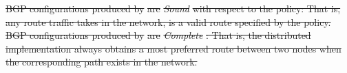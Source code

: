 \documentclass{sig-alternate-10pt}
\newcommand{\sysname}{{\small \sf Propane}\xspace}
\providecommand{\DIFdel}[1]{{\protect\color{red}\sout{#1}}}                      %
\providecommand{\DIFdelbegin}{} %
\providecommand{\DIFdelend}{} %
\begin{document}
\DIFdel{BGP configurations produced by }%
\DIFdel{are }\textit{\DIFdel{Sound}} %
\DIFdel{with respect to the policy: That is, any route traffic takes in the network, is a valid route specified by the policy.
}%
\DIFdelend %
%
\DIFdelbegin %
\DIFdel{BGP configurations produced by }%
\DIFdel{are }\textit{\DIFdel{Complete}}%
\DIFdel{: That is, the distributed implementation always obtains a most preferred route between two nodes when the corresponding path exists in the network.
}%
\DIFdelend %
%
%
%
\end{document}
